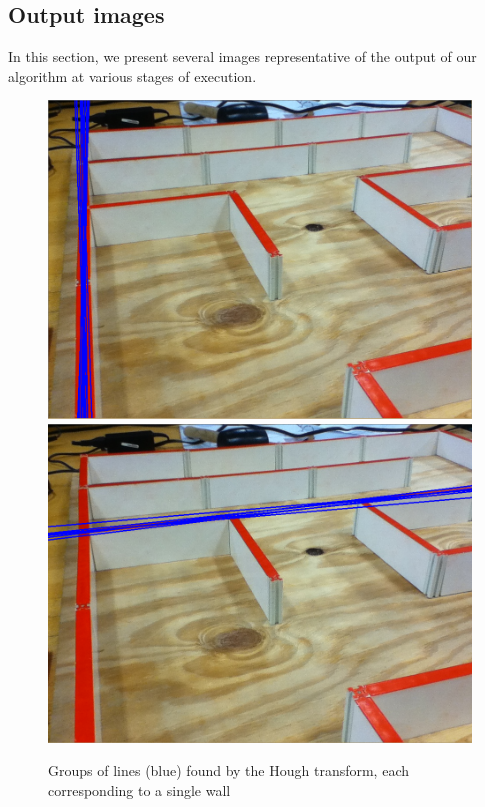 \documentclass[10pt,twocolumn,letterpaper]{article}
\begin{document}
\subsection{Output images}
\label{sub:output_images}

In this section, we present several images representative of the output of our algorithm at various stages of execution.
\vfill
\clearpage
\begin{figure}[h!]
\begin{center}
	\includegraphics[width=0.8\linewidth]{images/houghlines1.png}
	\includegraphics[width=0.8\linewidth]{images/houghlines2.png}
\end{center}
\caption{Groups of lines (blue) found by the Hough transform, each corresponding to a single wall}
\label{fig:houghgroups}
\end{figure}
\end{document}
